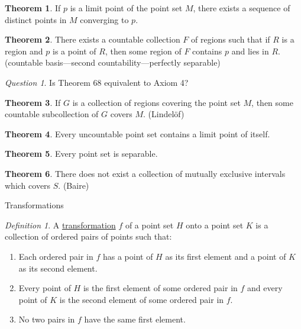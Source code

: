 \documentclass[12pt, oneside, letter] {amsart}
\theoremstyle {definition}
\newtheorem {thm} {Theorem}
\theoremstyle {remark}
\newtheorem* {defn} {Definition}
\newtheorem* {qn} {Question}
\begin{document}
\begin{thm}
  If $p$ is a limit point of the point set $M$, there exists a
  sequence of distinct points in $M$ converging to $p$.
\end{thm}

\begin{thm}
  There exists a countable collection $F$ of regions such that if $R$
  is a region and $p$ is a point of $R$, then some region of $F$
  contains $p$ and lies in $R$. (countable basis---second
  countability---perfectly separable)
\end{thm}

\begin{qn}
  Is Theorem 68 equivalent to Axiom 4?
\end{qn}

\begin{thm}
  If $G$ is a collection of regions covering the point set $M$, then
  some countable subcollection of $G$ covers $M$. (Lindel\" {o}f)
\end{thm}

\begin{thm}
  Every uncountable point set contains a limit point of itself.
\end{thm}

\begin{thm}
  Every point set is separable.
\end{thm}

\begin{thm}
  There does not exist a collection of mutually exclusive intervals
  which covers $S$. (Baire)
\end{thm}

\newpage

\begin{center}
  Transformations
\end{center}

\begin{defn}
  A \underline {transformation} $f$ of a point set $H$ onto a point
  set $K$ is a collection of ordered pairs of points such that:
  \begin{enumerate}
  \item Each ordered pair in $f$ has a point of $H$ as its first
    element and a point of $K$ as its second element.
  \item Every point of $H$ is the first element of some ordered pair
    in $f$ and every point of $K$ is the second element of some
    ordered pair in $f$.
  \item No two pairs in $f$ have the same first element.
  \end{enumerate}
\end{defn}
\end{document}
